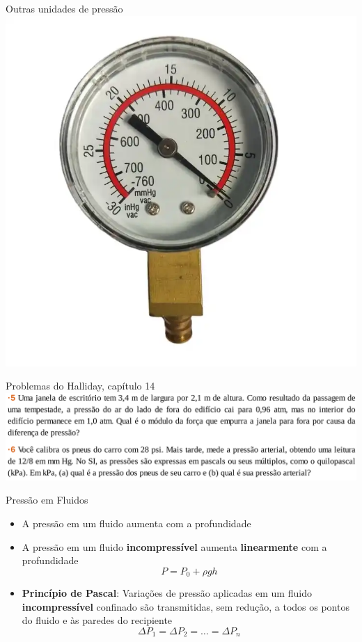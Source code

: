 \documentclass[t,%
brazilian,%
11pt,%
aspectratio=169,%
table%
]{beamer}
\begin{document}
\begin{frame}{Outras unidades de pressão}
    \includegraphics[height=\textheight-106pt]{images/mmHg.png}
\end{frame}

\begin{frame}{Problemas do Halliday, capítulo 14}
    \includegraphics[width=\textwidth]{images/Captura de tela de 2024-01-11 14-52-09.png}
\end{frame}

\begin{frame}{Pressão em Fluidos}
    \begin{itemize}
        \item A pressão em um fluido aumenta com a profundidade
        \item A pressão em um fluido \textbf{incompressível} aumenta \textbf{linearmente} com a profundidade
            \[
                P=P_0 + \rho g h
            \]
        \item \textbf{Princípio de Pascal}: Variações de pressão aplicadas em
            um fluido \textbf{incompressível} confinado são transmitidas, sem
            redução, a todos os pontos do fluido e às paredes do recipiente
            \[
                \Delta P_1 = \Delta P_2 = \ldots = \Delta P_n
            \]
    \end{itemize}
\end{frame}
\end{document}
